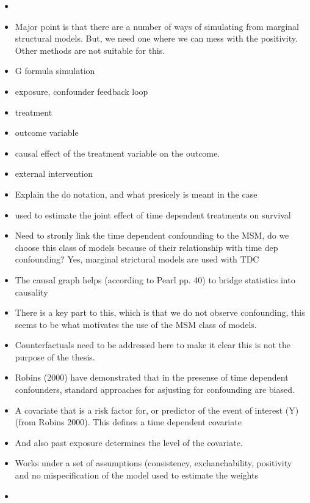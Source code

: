 \documentclass[11pt]{article}
\begin{document}
\begin{itemize}
\item
\item
  Major point is that there are a number of ways of simulating from
  marginal structural models. But, we need one where we can mess with
  the positivity. Other methods are not suitable for this.
\item
  G formula simulation
\item
  exposure, confounder feedback loop
\item
  treatment
\item
  outcome variable
\item
  causal effect of the treatment variable on the outcome.
\item
  external intervention
\item
  Explain the do notation, and what presicely is meant in the case\\
\item
  used to estimate the joint effect of time dependent treatments on
  survival
\item
  Need to stronly link the time dependent confounding to the MSM, do we
  choose this class of models because of their relationship with time
  dep confounding? Yes, marginal strictural models are used with TDC
\item
  The causal graph helps (according to Pearl pp. 40) to bridge
  statistics into causality
\item
  There is a key part to this, which is that we do not observe
  confounding, this seems to be what motivates the use of the MSM class
  of models.
\item
  Counterfactuals need to be addressed here to make it clear this is not
  the purpose of the thesis.
\item
  Robins (2000) have demonstrated that in the presense of time dependent
  confounders, standard approaches for asjusting for confounding are
  biased.
\item
  A covariate that is a risk factor for, or predictor of the event of
  interest (Y) (from Robins 2000). This defines a time dependent
  covariate
\item
  And also past exposure determines the level of the covariate.
\item
  Works under a set of assumptions (consistency, exchanchability,
  positivity and no mispecification of the model used to estimate the
  weights
\item
\end{itemize}
\end{document}
